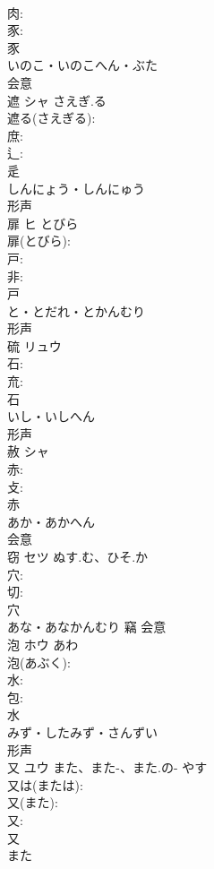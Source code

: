 \documentclass[8pt]{extreport}
\begin{document}
\begin{CJK}{UTF8}{min}
\\	肉: 
\\	豕: 
\\	豕	
\\	いのこ・いのこへん・ぶた	
\\	会意 
\\	遮	シャ	さえぎ.る		
\\	遮る(さえぎる): 
\\	庶: 
\\	辶: 
\\	辵	
\\	しんにょう・しんにゅう	
\\	形声 
\\	扉	ヒ	とびら		
\\	扉(とびら): 
\\	戸: 
\\	非: 
\\	戸	
\\	と・とだれ・とかんむり	
\\	形声 
\\	硫	リュウ			
\\	石: 
\\	㐬: 
\\	石	
\\	いし・いしへん	
\\	形声 
\\	赦	シャ			
\\	赤: 
\\	攴: 
\\	赤	
\\	あか・あかへん	
\\	会意 
\\	窃	セツ	ぬす.む、ひそ.か		
\\	穴: 
\\	切: 
\\	穴	
\\	あな・あなかんむり	竊	会意 
\\	泡	ホウ	あわ		
\\	泡(あぶく): 
\\	水: 
\\	包: 
\\	水	
\\	みず・したみず・さんずい	
\\	形声 
\\	又	ユウ	また、また-、また.の-	やす	
\\	又は(または): 
\\	又(また): 
\\	又: 
\\	又	
\\	また	

\end{CJK}
\end{document}
